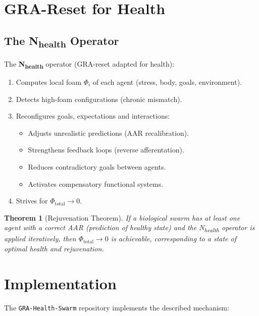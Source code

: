 \documentclass[11pt,a4paper]{article}
\newtheorem{theorem}{Theorem}
\begin{document}
\section{GRA-Reset for Health}

\subsection{The N\textsubscript{health} Operator}

The \textbf{N\textsubscript{health}} operator (GRA-reset adapted for health):
\begin{enumerate}
  \item Computes local foam $\Phi_i$ of each agent (stress, body, goals, environment).
  \item Detects high-foam configurations (chronic mismatch).
  \item Reconfigures goals, expectations and interactions:
  \begin{itemize}
    \item Adjusts unrealistic predictions (AAR recalibration).
    \item Strengthens feedback loops (reverse afferentation).
    \item Reduces contradictory goals between agents.
    \item Activates compensatory functional systems.
  \end{itemize}
  \item Strives for $\Phi_{\text{total}} \to 0$.
\end{enumerate}

\begin{theorem}[Rejuvenation Theorem]
If a biological swarm has at least one agent with a correct AAR (prediction of healthy state) and the N\textsubscript{health} operator is applied iteratively, then $\Phi_{\text{total}} \to 0$ is achievable, corresponding to a state of optimal health and rejuvenation.
\end{theorem}

\section{Implementation}

The \texttt{GRA-Health-Swarm} repository implements the described mechanism:
\end{document}
